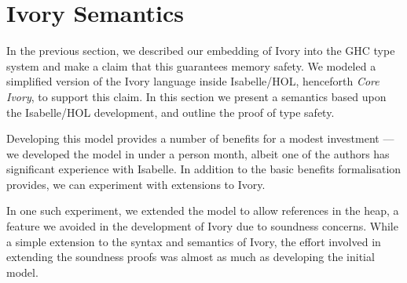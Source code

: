 \newcommand{\coreivory}{Core Ivory}

\section{Ivory Semantics}
\label{sec:semantics}

In the previous section, we described our embedding of Ivory into the
GHC type system and make a claim that this guarantees memory safety.
We modeled a simplified version of the Ivory language inside
Isabelle/HOL, henceforth \emph{\coreivory{}}, to support
this claim.  In this section we present a semantics based upon the
Isabelle/HOL development, and outline the proof of type safety.

Developing this model provides a number of benefits for a modest
investment --- we developed the model in under a person month, albeit
one of the authors has significant experience with Isabelle.  In
addition to the basic benefits formalisation provides, we can
experiment with extensions to Ivory.

In one such experiment, we extended the model to allow references in
the heap, a feature we avoided in the development of Ivory due to
soundness concerns.  While a simple extension to the syntax and
semantics of Ivory, the effort involved in extending the soundness
proofs was almost as much as developing the initial model.  

\newcommand{\sep}{\ |\ }

